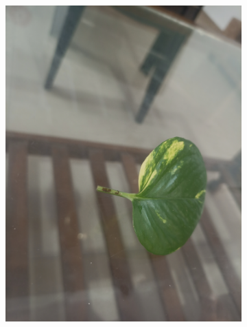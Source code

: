 \documentclass[twocolumn]{article}
\begin{document}
\begin{figure}[H]
    \begin{subfigure}[b]{0.30\columnwidth}
        \includegraphics[width=\textwidth]{money7}
    \end{subfigure}
    \hfill
    \begin{subfigure}[b]{0.30\columnwidth}

\end{subfigure}
\end{figure}
\end{document}
